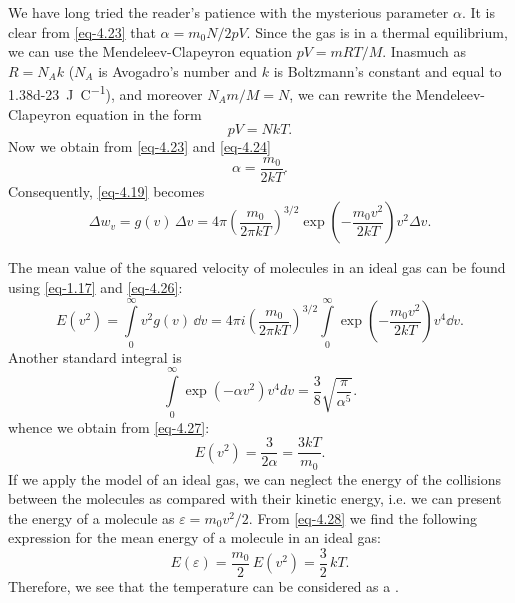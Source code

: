  We have long tried the reader's patience with the mysterious parameter $\alpha$. It is clear from \eqref{eq-4.23} that $\alpha = m_{0}N /2pV$. Since the gas is in a thermal equilibrium, we can use the Mendeleev-Clapeyron equation	$pV= mRT/ M$. Inasmuch as	$R = N_{A} k$ ($N_{A}$ is Avogadro's number	and $k$ is Boltzmann's	constant and equal to \SI{1.38d-23}{\joule\per\coulomb}), and moreover $N_{A} m / M = N$, we can rewrite the Mendeleev-Clapeyron equation in the form
\begin{equation}%
pV= NkT.
\label{eq-4.24}
\end{equation}
Now we obtain from \eqref{eq-4.23} and \eqref{eq-4.24}
\begin{equation}%
\alpha = \frac{m_{0} }{2kT}.
\label{eq-4.25}
\end{equation}
Consequently, \eqref{eq-4.19} becomes
\begin{equation}%
\Delta w_{v}  = g(v) \, \Delta v = 4 \pi \left( \frac{m_{0}}{2 \pi k T} \right) ^{3/2} \exp \left(- \frac{m_{0} v^{2}}{2 kT} \right)  v^{2} \Delta v.
\label{eq-4.26}
\end{equation}

 The mean value of the squared velocity of molecules in an ideal gas can be found using \eqref{eq-1.17} and \eqref{eq-4.26}:
\begin{equation}%
E(v^{2})  = \int\limits_{0}^{\infty}  v^{2}  g(v) \, \dd v = 4 \pi  i \left( \frac{m_{0}}{2 \pi k T} \right) ^{3/2} \int\limits_{0}^{\infty}  \exp \left(- \frac{m_{0} v^{2}}{2 kT} \right)  v^{4} \dd v.
\label{eq-4.27}
\end{equation}
Another standard integral is
\begin{equation*}%
\int\limits_{0}^{\infty}  \exp \left(- \alpha v^{2} \right)  v^{4} dv = \frac{3}{8} \sqrt{\frac{\pi}{ \alpha^{5}}}.
\end{equation*}
whence we obtain from \eqref{eq-4.27}:
\begin{equation}%
E(v^{2})  = \frac{3}{2 \alpha} = \frac{3kT}{m_{0}}.
\label{eq-4.28}
\end{equation}
If we apply the model of an ideal gas, we can neglect the energy of the collisions between the molecules as compared with their kinetic energy, i.e. we can present the energy of a molecule as $\varepsilon = m_{0} v^{2}/2$. From \eqref{eq-4.28} we find the following expression for the mean energy of a molecule in an ideal gas:
\begin{equation}%
E(\varepsilon)  = \frac{m_{0}}{2}\, E (v^{2}) = \frac{3}{2}\, kT.
\label{eq-4.29}
\end{equation}
Therefore, we see that the temperature can be considered as a .

